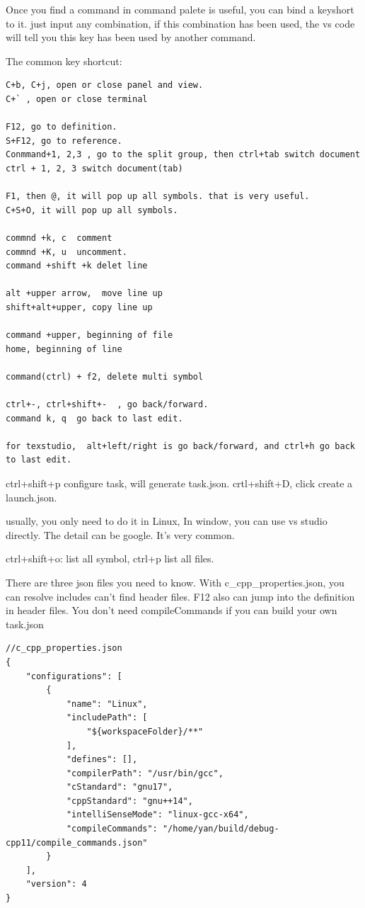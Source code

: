 \documentclass[paper=8.5in:11in, twoside, 12pt, pagesize=pdftex]{book}
\begin{document}
Once you find a command in command palete is useful, you can bind a keyshort to it.  just input any combination, if this combination has been used,  the vs code will tell you this key has been used by another command. 
	
The common key shortcut:

\begin{lstlisting}[]
C+b, C+j, open or close panel and view. 
C+` , open or close terminal

F12, go to definition. 
S+F12, go to reference. 
Conmmand+1, 2,3 , go to the split group, then ctrl+tab switch document
ctrl + 1, 2, 3 switch document(tab)

F1, then @, it will pop up all symbols. that is very useful.
C+S+O, it will pop up all symbols. 

commnd +k, c  comment
commnd +K, u  uncomment.
command +shift +k delet line

alt +upper arrow,  move line up
shift+alt+upper, copy line up

command +upper, beginning of file
home, beginning of line

command(ctrl) + f2, delete multi symbol

ctrl+-, ctrl+shift+-  , go back/forward. 
command k, q  go back to last edit.

for texstudio,  alt+left/right is go back/forward, and ctrl+h go back to last edit.
\end{lstlisting}



ctrl+shift+p configure task, will generate task.json. crtl+shift+D, click create a launch.json. 

usually, you only need to do it in Linux, In window, you can use vs studio directly. The detail can be google. It's very common.

ctrl+shift+o: list all symbol, ctrl+p list all files.



There are three json files you need to know. With c\_cpp\_properties.json, you can resolve includes can't find header files. F12 also can jump into the definition in header files. You don't need compileCommands if you can build your own task.json
    
\begin{lstlisting}[mathescape=false]
//c_cpp_properties.json
{
    "configurations": [
        {
            "name": "Linux",
            "includePath": [
                "${workspaceFolder}/**"
            ],
            "defines": [],
            "compilerPath": "/usr/bin/gcc",
            "cStandard": "gnu17",
            "cppStandard": "gnu++14",
            "intelliSenseMode": "linux-gcc-x64",
            "compileCommands": "/home/yan/build/debug-cpp11/compile_commands.json"
        }
    ],
    "version": 4
}
\end{lstlisting}
\end{document}
